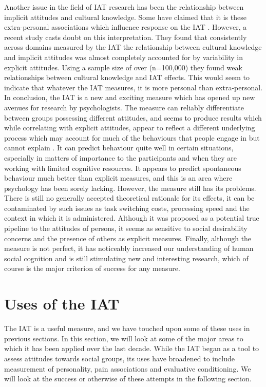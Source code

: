 Another issue in the field of IAT research has been the relationship between implicit attitudes and cultural knowledge. Some have claimed that it is these extra-personal associations which influence response on the IAT \cite{Olson2004}. However, a recent study \cite{Nosek2007a} casts doubt on this interpretation. They found that consistently across domains measured by the IAT the relationship between cultural knowledge and implicit attitudes was almost completely accounted for by variability in explicit attitudes. Using a sample size of over (n=100,000) they found weak relationships between cultural knowledge and IAT effects. This would seem to indicate that whatever the IAT measures, it is more personal than extra-personal. 
In conclusion, the IAT is a new and exciting measure which has opened up new avenues for research by psychologists.   The measure can reliably differentiate between groups possessing different attitudes, and seems to produce results which while correlating with explicit attitudes, appear to reflect a different underlying process which may account for much of the behaviours that people engage in but cannot explain \cite{Nosek2007a}. It can predict behaviour quite well in certain situations, especially in matters of importance to the participants and when they are working with limited cognitive resources. It appears to predict spontaneous behaviour much better than explicit measures, and this is an area where psychology has been sorely lacking. 
However, the measure still has its problems. There is still no generally accepted theoretical rationale for its effects, it can be contaminated by such issues as task switching costs, processing speed and the context in which it is administered. Although it was proposed as a potential true pipeline to the attitudes of persons, it seems as sensitive to social desirability concerns and the presence of others as explicit measures. Finally, although the measure is not perfect, it has noticeably increased our understanding of human social cognition and is still stimulating new and interesting research, which of course is the major criterion of success for any measure. 

\section{Uses of the IAT}

The IAT is a useful measure, and we have touched upon some of these uses in previous sections. In this section, we will look at some of the major areas to which it has been applied over the last decade. While the IAT began as a tool to assess attitudes towards social groups, its uses have broadened to include measurement of personality, pain associations and evaluative conditioning. We will look at the success or otherwise of these attempts in the following section. 

